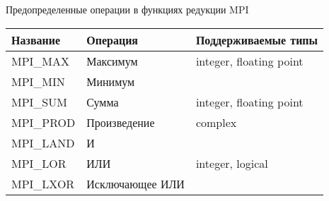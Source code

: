 \begin{frame}{Предопределенные операции в функциях редукции MPI}

\begin{table}[htp]
    \begin{center}
    \begin{tabular}{|l|l|l|}
        \hline
        Название    &   Операция        &   Поддерживаемые типы     \\
        \hline
        MPI_MAX     &   Максимум        &   integer, floating point \\
        MPI_MIN     &   Минимум         &                           \\
        \hline
        MPI_SUM     &   Сумма           &   integer, floating point \\
        MPI_PROD    &   Произведение    &   complex                 \\
        \hline
        MPI_LAND    &   И               &                           \\
        MPI_LOR     &   ИЛИ             &   integer, logical        \\
        MPI_LXOR    &   Исключающее ИЛИ &                           \\  
        \hline
    \end{tabular}
    \end{center}
\end{table}

\end{frame}

